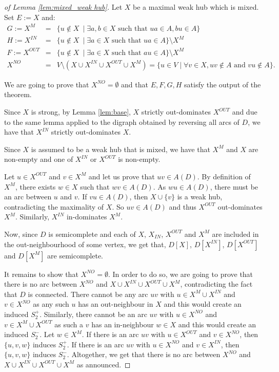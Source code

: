 \begin{proof}[of Lemma \ref{lem:mixed_weak hub}]
Let $X$ be a maximal weak hub which is mixed. Set $E:=X$ and:
\begin{eqnarray*}
G:= X^{M} &=& \{u \notin X \ \mid \exists a, b \in X \text{ such that } ua \in A, bu \in A \} \\
H:=X^{IN} &=& \{u \notin X \ \mid \exists a \in X \text{ such that } ua \in A \}\setminus X^M\\
F:=X^{OUT} &=& \{u \notin X\ \mid \exists a \in X \text{ such that } au \in A \}\setminus X^M \\
X^{NO} &=&V \setminus (X \cup X^{IN} \cup X^{OUT} \cup X^{M}) = \{u \in V \mid \forall v \in X, uv \notin A\text{ and } vu \notin A\}. 
\end{eqnarray*}

We are going to prove that $X^{NO} = \emptyset$ and that $E,F,G,H$ satisfy the output of the theorem. 

Since $X$ is strong, by Lemma \ref{lem:base}, $X$ strictly out-dominates $X^{OUT}$  and due to the same lemma applied to the digraph obtained by reversing all arcs of $D$, we have that $X^{IN}$ strictly out-dominates $X$. 

Since $X$ is assumed to be a weak hub that is mixed, we have that $X^{M}$ and $X$ are non-empty and one of $X^{IN}$ or $X^{OUT}$ is non-empty.

Let  $u \in X^{OUT}$ and $v \in X^{M}$ and let us prove that $uv \in A(D)$. By definition of $X^M$, there exists $w \in X$ such that $wv \in A(D)$. As $wu \in A(D)$, there must be an arc between $u$ and $v$. If $vu \in A(D)$,  then $X \cup \{v\}$ is a weak hub, contradicting the maximality of $X$. So $uv \in A(D)$ and thus $X^{OUT}$ out-dominates $X^M$. Similarly, $X^{IN}$ in-dominates $X^{M}$. 

Now, since $D$ is semicomplete and each of $X$, $X_{IN}$, $X^{OUT}$ and $X^M$ are included in the out-neighbourhood  of some vertex, we get that, $D[X]$, $D[X^{IN}]$, $D[X^{OUT}]$ and $D[X^M]$ are semicomplete. 

It remains to show that $X^{NO} = \emptyset$. In order to do so, we are going to prove that there is no arc between $X^{NO}$ and $X \cup X^{IN} \cup X^{OUT} \cup X^M$, contradicting the fact that $D$ is connected.  
There cannot be any arc $uv$ with $u \in X^{M} \cup X^{IN}$ and  $v \in X^{NO}$ as any such $u$ has an out-neighbour in $X$ and this would create an induced $S^+_2$. Similarly, there cannot be an arc $uv$ with $u \in X^{NO}$ and $v \in X^{M} \cup X^{OUT}$ as such a $v$ has an in-neighbour $w \in X$ and this would create an induced $S^-_2$. 
Let $w \in X^{M}$. 
If there is an arc $uv$ with $u \in X^{OUT}$ and $v \in X^{NO}$, then $\{u,v,w\}$ induces $S_2^+$. If there is an arc $uv$ with $u \in X^{NO}$ and $v \in X^{IN}$, then $\{u,v,w\}$ induces $S^-_2$. 
Altogether, we get that there is no arc between $X^{NO}$ and $X \cup X^{IN} \cup X^{OUT} \cup X^M$ as announced. 


\end{proof}
